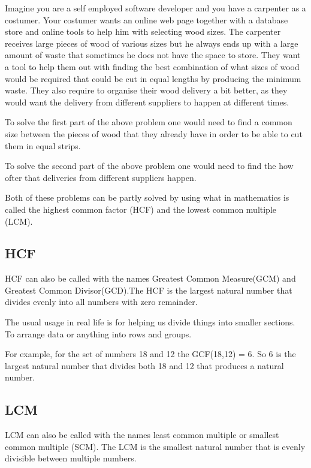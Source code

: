\documentclass[
]{book}
\begin{document}
Imagine you are a self employed software developer and you have a carpenter as a costumer. Your costumer wants an online web page together with a database store and online tools to help him with selecting wood sizes. The carpenter receives large pieces of wood of various sizes but he always ends up with a large amount of waste that sometimes he does not have the space to store. They want a tool to help them out with finding the best combination of what sizes of wood would be required that could be cut in equal lengths by producing the minimum waste.
They also require to organise their wood delivery a bit better, as they would want the delivery from different suppliers to happen at different times.

To solve the first part of the above problem one would need to find a common size between the pieces of wood that they already have in order to be able to cut them in equal strips.

To solve the second part of the above problem one would need to find the how ofter that deliveries from different suppliers happen.

Both of these problems can be partly solved by using what in mathematics is called the highest common factor (HCF) and the lowest common multiple (LCM).

\hypertarget{hcf}{%
\subsection{HCF}\label{hcf}}

HCF can also be called with the names Greatest Common Measure(GCM) and Greatest Common Divisor(GCD).The HCF is the largest natural number that divides evenly into all numbers with zero remainder.

The usual usage in real life is for helping us divide things into smaller sections. To arrange data or anything into rows and groups.

For example, for the set of numbers 18 and 12 the GCF(18,12) = 6. So 6 is the largest natural number that divides both 18 and 12 that produces a natural number.

\hypertarget{lcm}{%
\subsection{LCM}\label{lcm}}

LCM can also be called with the names least common multiple or smallest common multiple (SCM). The LCM is the smallest natural number that is evenly divisible between multiple numbers.
\end{document}
